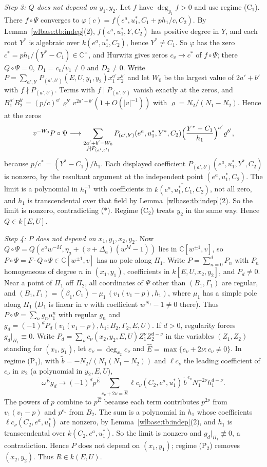 \documentclass[11pt,a4paper]{article}
\theoremstyle{definition}\newtheorem{definition}[theorem]{Definition}
\theoremstyle{remark}\newtheorem{remark}[theorem]{Remark}
\newcommand{\C}{\mathbb C}\newcommand{\Z}{\mathbb Z}
\begin{document}
\emph{Step 3: $Q$ does not depend on $y_1,y_2$.} Let $f$ have
$\deg_{y_1}f>0$ and use regime (C$_1$). There $f\circ\Psi$ converges to
$\varphi(c)=f(e^a,u_1^*,C_1+ph_1/c,C_2)$. By Lemma~\ref{wlbase:tb:indep}(2),
$f(e^a,u_1^*,Y,C_2)$ has positive degree in $Y$, and each root $Y^*$ is
algebraic over $k(e^a,u_1^*,C_2)$, hence $Y^*\ne C_1$. So $\varphi$ has the zero
$c^*=ph_1/(Y^*-C_1)\in\C^\times$, and Hurwitz gives zeros $c_v\to c^*$ of
$f\circ\Psi$; there $Q\circ\Psi=0$, $D_1=c_v/v_1\ne0$ and $D_2\ne0$. Write
$P=\sum_{a',b'}P_{(a',b')}(E,U,y_1,y_2)x_1^{a'}x_2^{b'}$ and let $W_0$ be the
largest value of $2a'+b'$ with $f\nmid P_{(a',b')}$. Terms with
$f\mid P_{(a',b')}$ vanish exactly at the zeros, and
$B_1^{a'}B_2^{b'}=(p/c)^{a'}\varrho^{b'}v^{2a'+b'}(1+O(|v|^{-1}))$ with
$\varrho=N_2/(N_1-N_2)$. Hence at the zeros
\[
 v^{-W_0}P\circ\Psi\longrightarrow
 \sum_{\substack{2a'+b'=W_0\\ f\nmid P_{(a',b')}}}
 P_{(a',b')}(e^a,u_1^*,Y^*,C_2)\Bigl(\frac{Y^*-C_1}{h_1}\Bigr)^{a'}\varrho^{b'},
\]
because $p/c^*=(Y^*-C_1)/h_1$. Each displayed coefficient
$P_{(a',b')}(e^a,u_1^*,Y^*,C_2)$ is nonzero, by the resultant argument at the
independent point $(e^a,u_1^*,C_2)$. The limit is a polynomial in $h_1^{-1}$
with coefficients in $\overline{k(e^a,u_1^*,C_1,C_2)}$, not all zero, and
$h_1$ is transcendental over that field by Lemma~\ref{wlbase:tb:indep}(2). So the
limit is nonzero, contradicting ($\ast$). Regime (C$_2$) treats $y_2$ in the
same way. Hence $Q\in k[E,U]$.

\emph{Step 4: $P$ does not depend on $x_1,y_1,x_2,y_2$.} Now
$Q\circ\Psi=Q(e^aw^{-M},\eta_a+(v+\Delta_a)(w^M-1))$ lies in $\C[w^{\pm1},v]$,
so $P\circ\Psi=F\cdot Q\circ\Psi\in\C[w^{\pm1},v]$ has no pole along
$\Pi_1$. Write $P=\sum_{n=0}^dP_n$ with $P_n$ homogeneous of degree $n$ in
$(x_1,y_1)$, coefficients in $k[E,U,x_2,y_2]$, and $P_d\ne0$. Near a point of
$\Pi_1$ off $\Pi_2$, all coordinates of $\Psi$ other than $(B_1,\Gamma_1)$
are regular, and $(B_1,\Gamma_1)=(\beta_1,C_1)-\mu_1\,(v_1(v_1-p),h_1)$,
where $\mu_1$ has a simple pole along $\Pi_1$ ($D_1$ is linear in $v$ with
coefficient $w^{N_1}-1\ne0$ there). Thus $P\circ\Psi=\sum_ng_n\mu_1^n$ with
regular $g_n$ and $g_d=(-1)^dP_d(v_1(v_1-p),h_1;B_2,\Gamma_2,E,U)$. If $d>0$,
regularity forces $g_d|_{\Pi_1}\equiv0$. Write
$P_d=\sum_\nu c_\nu(x_2,y_2,E,U)Z_1^\nu Z_2^{d-\nu}$ in the variables
$(Z_1,Z_2)$ standing for $(x_1,y_1)$, let $e_\nu=\deg_{x_2}c_\nu$ and
$\widehat E=\max\{e_\nu+2\nu:c_\nu\ne0\}$. In regime (P$_1$), with
$\tilde b=-N_2/(N_1(N_1-N_2))$ and $\ell c_\nu$ the leading coefficient of
$c_\nu$ in $x_2$ (a polynomial in $y_2,E,U$),
\[
 \omega^{\widehat E}g_d\longrightarrow
 (-1)^dp^{\widehat E}\sum_{e_\nu+2\nu=\widehat E}
 \ell c_\nu(C_2,e^a,u_1^*)\,\tilde b^{\,e_\nu}N_1^{-2\nu}h_1^{d-\nu}.
\]
The powers of $p$ combine to $p^{\widehat E}$ because each term contributes
$p^{2\nu}$ from $v_1(v_1-p)$ and $p^{e_\nu}$ from $B_2$. The sum is a
polynomial in $h_1$ whose coefficients $\ell c_\nu(C_2,e^a,u_1^*)$ are nonzero,
by Lemma~\ref{wlbase:tb:indep}(2), and $h_1$ is transcendental over
$k(C_2,e^a,u_1^*)$. So the limit is nonzero and $g_d|_{\Pi_1}\not\equiv0$, a
contradiction. Hence $P$ does not depend on $(x_1,y_1)$; regime (P$_2$)
removes $(x_2,y_2)$. Thus $R\in k(E,U)$.
\end{document}
